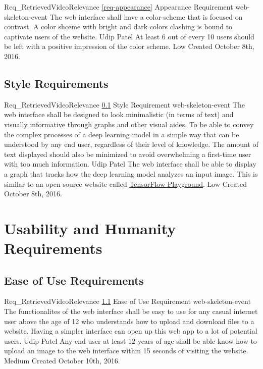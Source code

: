 \documentclass{scrreprt}
\begin{document}
\requirement
{Req_RetrievedVideoRelevance}
{\ref{req-appearance} Appearance Requirement}
{web-skeleton-event} %
{The web interface shall have a color-scheme that is focused on contrast.}
{A color shceme with bright and dark colors clashing is bound to captivate users of the website.}
{Udip Patel}
{At least 6 out of every 10 users should be left with a positive impression of the color scheme.}
{Low}
{Created October 8th, 2016.}

\subsection{Style Requirements}
\label{req-style}

\requirement
{Req_RetrievedVideoRelevance}
{\ref{req-style} Style Requirement}
{web-skeleton-event} %
{The web interface shall be designed to look minimalistic (in terms of text) and visually informative through graphs and other visual aides.}
{To be able to convey the complex processes of a deep learning model in a simple way that can be understood by any end user, regardless of their level of knowledge. The amount of text displayed should also be minimized to avoid overwhelming a first-time user with too much information.}
{Udip Patel}
{The web interface shall be able to display a graph that tracks how the deep learning model analyzes an input image. This is similar to an open-source website called \href{http://playground.tensorflow.org/}{TensorFlow Playground}.}
{Low}
{Created October 8th, 2016.}

\section{Usability and Humanity Requirements}

\subsection{Ease of Use Requirements}
\label{req-ease-of-use}

\requirement
{Req_RetrievedVideoRelevance}
{\ref{req-ease-of-use} Ease of Use Requirement}
{web-skeleton-event} %
{The functionalites of the web interface shall be easy to use for any casual internet user above the age of 12 who understands how to upload and download files to a website.}
{Having a simpler interface can open up this web app to a lot of potential users.}
{Udip Patel}
{Any end user at least 12 years of age shall be able know how to upload an image to the web interface within 15 seconds of visiting the website.}
{Medium}
{Created October 10th, 2016.}
\end{document}

